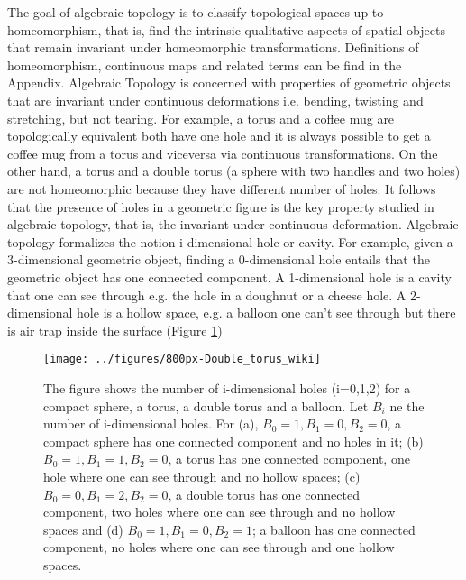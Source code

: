 \documentclass[onecollarge,runningheads]{svjour2}
\begin{document}
The goal of algebraic topology is to classify topological spaces up to homeomorphism, that is, find the intrinsic qualitative aspects of spatial objects that remain invariant under homeomorphic transformations. Definitions of homeomorphism, continuous maps and related terms can be find in the Appendix. Algebraic Topology is concerned with properties of geometric objects that are invariant under continuous deformations i.e. bending, twisting and stretching, but not tearing.
For example, a torus and a coffee mug are topologically equivalent both have one hole and it is always possible to get a coffee mug from a torus and viceversa via continuous transformations. On the other hand, a torus and a double torus (a sphere with two handles and two holes) are not homeomorphic because they have different number of holes.
It follows that the presence of holes in a geometric figure is the key property studied in algebraic topology, that is, the invariant under continuous deformation. 
Algebraic topology formalizes the notion i-dimensional hole or cavity. For example, given a 3-dimensional geometric object, finding a 0-dimensional hole entails that the geometric object has one connected component. A 1-dimensional hole is a cavity that one can see through e.g. the hole in a doughnut or a cheese hole. A 2-dimensional hole is a hollow space, e.g. a balloon one can't see through but there is air trap inside the surface (Figure \ref{fig:iholes})

 \begin{figure}[h]
        \centering
        \texttt{[image: ../figures/800px-Double\_torus\_wiki]}
        \caption{The figure shows the number of i-dimensional holes (i=0,1,2) for a compact sphere, a torus, a double torus and a balloon.
        Let $B_i$ ne the number of i-dimensional holes. For (a), $B_0=1, B_1=0, B_2=0$, a compact sphere has one connected component and no holes in it; (b) $B_0=1, B_1=1, B_2=0$, a torus has one connected component, one hole where one can see through and no hollow spaces; (c) $B_0=0, B_1=2, B_2=0$, a double torus has one connected component, two holes where one can see through and no hollow spaces and (d) $B_0=1, B_1=0, B_2=1$; a balloon has one connected component, no holes where one can see through and one hollow spaces.
        }
\label{fig:iholes}
\end{figure}
\end{document}
